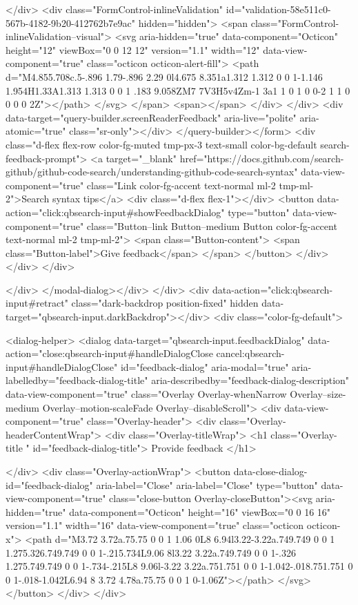         </div>
      <div class="FormControl-inlineValidation" id="validation-58e511c0-567b-4182-9b20-412762b7e9ac" hidden="hidden">
        <span class="FormControl-inlineValidation--visual">
          <svg aria-hidden="true" data-component="Octicon" height="12" viewBox="0 0 12 12" version="1.1" width="12" data-view-component="true" class="octicon octicon-alert-fill">
    <path d="M4.855.708c.5-.896 1.79-.896 2.29 0l4.675 8.351a1.312 1.312 0 0 1-1.146 1.954H1.33A1.313 1.313 0 0 1 .183 9.058ZM7 7V3H5v4Zm-1 3a1 1 0 1 0 0-2 1 1 0 0 0 0 2Z"></path>
</svg>
        </span>
        <span></span>
</div>    </div>
    <div data-target="query-builder.screenReaderFeedback" aria-live="polite" aria-atomic="true" class="sr-only"></div>
</query-builder></form>
          <div class="d-flex flex-row color-fg-muted tmp-px-3 text-small color-bg-default search-feedback-prompt">
            <a target="_blank" href="https://docs.github.com/search-github/github-code-search/understanding-github-code-search-syntax" data-view-component="true" class="Link color-fg-accent text-normal ml-2 tmp-ml-2">Search syntax tips</a>            <div class="d-flex flex-1"></div>
              <button data-action="click:qbsearch-input#showFeedbackDialog" type="button" data-view-component="true" class="Button--link Button--medium Button color-fg-accent text-normal ml-2 tmp-ml-2">  <span class="Button-content">
    <span class="Button-label">Give feedback</span>
  </span>
</button>
          </div>
        </div>
</div>

    </div>
</modal-dialog></div>
  </div>
  <div data-action="click:qbsearch-input#retract" class="dark-backdrop position-fixed" hidden data-target="qbsearch-input.darkBackdrop"></div>
  <div class="color-fg-default">
    
<dialog-helper>
  <dialog data-target="qbsearch-input.feedbackDialog" data-action="close:qbsearch-input#handleDialogClose cancel:qbsearch-input#handleDialogClose" id="feedback-dialog" aria-modal="true" aria-labelledby="feedback-dialog-title" aria-describedby="feedback-dialog-description" data-view-component="true" class="Overlay Overlay-whenNarrow Overlay--size-medium Overlay--motion-scaleFade Overlay--disableScroll">
    <div data-view-component="true" class="Overlay-header">
  <div class="Overlay-headerContentWrap">
    <div class="Overlay-titleWrap">
      <h1 class="Overlay-title " id="feedback-dialog-title">
        Provide feedback
      </h1>
        
    </div>
    <div class="Overlay-actionWrap">
      <button data-close-dialog-id="feedback-dialog" aria-label="Close" aria-label="Close" type="button" data-view-component="true" class="close-button Overlay-closeButton"><svg aria-hidden="true" data-component="Octicon" height="16" viewBox="0 0 16 16" version="1.1" width="16" data-view-component="true" class="octicon octicon-x">
    <path d="M3.72 3.72a.75.75 0 0 1 1.06 0L8 6.94l3.22-3.22a.749.749 0 0 1 1.275.326.749.749 0 0 1-.215.734L9.06 8l3.22 3.22a.749.749 0 0 1-.326 1.275.749.749 0 0 1-.734-.215L8 9.06l-3.22 3.22a.751.751 0 0 1-1.042-.018.751.751 0 0 1-.018-1.042L6.94 8 3.72 4.78a.75.75 0 0 1 0-1.06Z"></path>
</svg></button>
    </div>
  </div>
  
